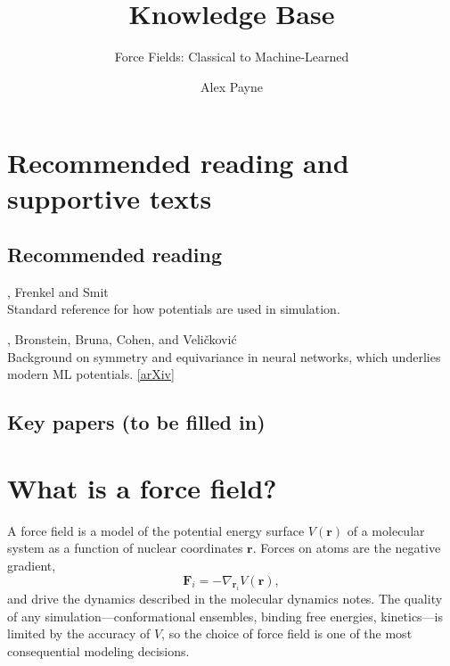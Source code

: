 \documentclass[english,course]{lecture}
\title{Knowledge Base}
\subtitle{Force Fields: Classical to Machine-Learned}
\author{Alex Payne}
\begin{document}
\vfill
\eject


\section{Recommended reading and supportive texts}

\subsection*{Recommended reading}

, Frenkel and Smit \\
Standard reference for how potentials are used in simulation.

, Bronstein, Bruna, Cohen, and Veli\v{c}kovi\'{c} \\
Background on symmetry and equivariance in neural networks, which underlies modern ML potentials.
\href{https://arxiv.org/abs/2104.13478}{[arXiv]}

\subsection*{Key papers (to be filled in)}


\vfill
\eject


\section{What is a force field?}

A force field is a model of the potential energy surface $V(\mathbf{r})$ of a molecular system as a function of nuclear coordinates $\mathbf{r}$. Forces on atoms are the negative gradient,
\[
\mathbf{F}_i = -\nabla_{\mathbf{r}_i} V(\mathbf{r}),
\]
and drive the dynamics described in the molecular dynamics notes. The quality of any simulation---conformational ensembles, binding free energies, kinetics---is limited by the accuracy of $V$, so the choice of force field is one of the most consequential modeling decisions.
\end{document}
